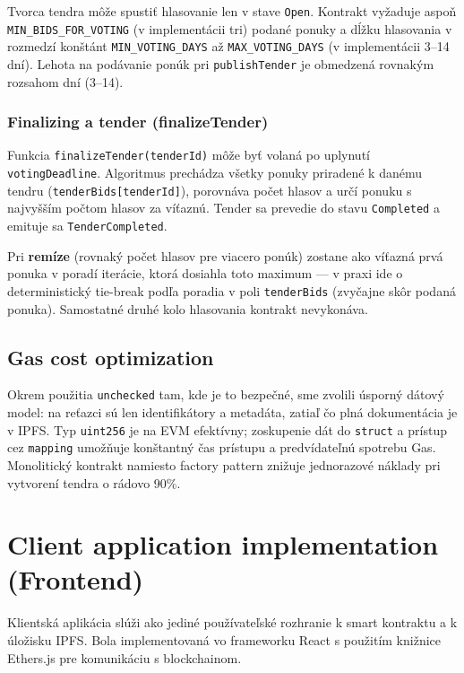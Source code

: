 Tvorca tendra môže spustiť hlasovanie len v stave \texttt{Open}. Kontrakt vyžaduje
aspoň \texttt{MIN\_BIDS\_FOR\_VOTING} (v implementácii tri) podané ponuky a dĺžku
hlasovania v rozmedzí konštánt \texttt{MIN\_VOTING\_DAYS} až \texttt{MAX\_VOTING\_DAYS}
(v implementácii 3--14 dní). Lehota na podávanie ponúk pri \texttt{publishTender}
je obmedzená rovnakým rozsahom dní (3--14).

\subsubsection{Finalizing a tender (finalizeTender)}

Funkcia \texttt{finalizeTender(tenderId)} môže byť volaná po uplynutí \texttt{votingDeadline}. Algoritmus prechádza všetky ponuky priradené k danému tendru (\texttt{tenderBids[tenderId]}), porovnáva počet hlasov a určí ponuku s najvyšším počtom hlasov za víťaznú. Tender sa prevedie do stavu \texttt{Completed} a emituje sa \texttt{TenderCompleted}.

Pri \textbf{remíze} (rovnaký počet hlasov pre viacero ponúk) zostane ako víťazná
prvá ponuka v poradí iterácie, ktorá dosiahla toto maximum --- v praxi ide o
deterministický tie-break podľa poradia v poli \texttt{tenderBids} (zvyčajne skôr
podaná ponuka). Samostatné druhé kolo hlasovania kontrakt nevykonáva.

\subsection{Gas cost optimization}

Okrem použitia \texttt{unchecked} tam, kde je to bezpečné, sme zvolili úsporný dátový model: na reťazci sú len identifikátory a metadáta, zatiaľ čo plná dokumentácia je v IPFS. Typ \texttt{uint256} je na EVM efektívny; zoskupenie dát do \texttt{struct} a prístup cez \texttt{mapping} umožňuje konštantný čas prístupu a predvídateľnú spotrebu Gas. Monolitický kontrakt namiesto factory pattern znižuje jednorazové náklady pri vytvorení tendra o rádovo 90\%.

\section{Client application implementation (Frontend)}

Klientská aplikácia slúži ako jediné používateľské rozhranie k smart kontraktu a k úložisku IPFS. Bola implementovaná vo frameworku React s použitím knižnice Ethers.js pre komunikáciu s blockchainom.

